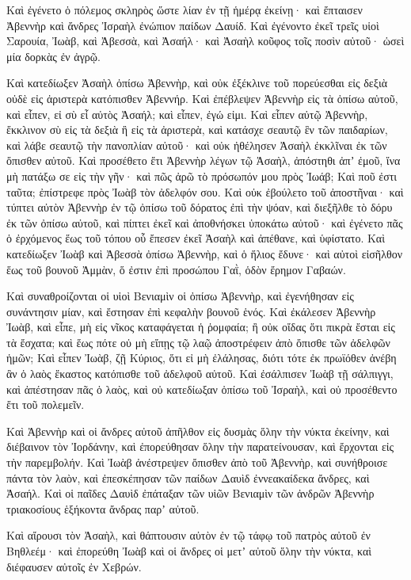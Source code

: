{Καὶ ἐγένετο ὁ πόλεμος σκληρὸς ὥστε λίαν ἐν τῇ ἡμέρᾳ ἐκείνῃ· καὶ ἔπταισεν Ἀβεννὴρ καὶ ἄνδρες Ἰσραὴλ ἐνώπιον παίδων Δαυίδ.
Καὶ ἐγένοντο ἐκεῖ τρεῖς υἱοὶ Σαρουία, Ἰωὰβ, καὶ Ἀβεσσὰ, καὶ Ἀσαήλ· καὶ Ἀσαὴλ κοῦφος τοῖς ποσὶν αὐτοῦ· ὡσεὶ μία δορκὰς ἐν ἀγρῷ.
\par }{\PP {}Καὶ κατεδίωξεν Ἀσαὴλ ὀπίσω Ἀβεννὴρ, καὶ οὐκ ἐξέκλινε τοῦ πορεύεσθαι εἰς δεξιὰ οὐδὲ εἰς ἀριστερὰ κατόπισθεν Ἀβεννήρ.
Καὶ ἐπέβλεψεν Ἀβεννὴρ εἰς τὰ ὀπίσω αὐτοῦ, καὶ εἶπεν, εἰ σὺ εἶ αὐτὸς Ἀσαήλ; καὶ εἶπεν, ἐγώ εἰμι.
Καὶ εἶπεν αὐτῷ Ἀβεννὴρ, ἔκκλινον σὺ εἰς τὰ δεξιὰ ἢ εἰς τὰ ἀριστερὰ, καὶ κατάσχε σεαυτῷ ἓν τῶν παιδαρίων, καὶ λάβε σεαυτῷ τὴν πανοπλίαν αὐτοῦ· καὶ οὐκ ἠθέλησεν Ἀσαὴλ ἐκκλῖναι ἐκ τῶν ὄπισθεν αὐτοῦ.
Καὶ προσέθετο ἔτι Ἀβεννὴρ λέγων τῷ Ἀσαὴλ, ἀπόστηθι ἀπʼ ἐμοῦ, ἵνα μὴ πατάξω σε εἰς τὴν γῆν· καὶ πῶς ἀρῶ τὸ πρόσωπόν μου πρὸς Ἰωάβ;
Καὶ ποῦ ἐστι ταῦτα; ἐπίστρεφε πρὸς Ἰωὰβ τὸν ἀδελφόν σου. Καὶ οὐκ ἐβούλετο τοῦ ἀποστῆναι· καὶ τύπτει αὐτὸν Ἀβεννὴρ ἐν τῷ ὀπίσω τοῦ δόρατος ἐπὶ τὴν ψόαν, καὶ διεξῆλθε τὸ δόρυ ἐκ τῶν ὀπίσω αὐτοῦ, καὶ πίπτει ἐκεῖ καὶ ἀποθνήσκει ὑποκάτω αὐτοῦ· καὶ ἐγένετο πᾶς ὁ ἐρχόμενος ἕως τοῦ τόπου οὗ ἔπεσεν ἐκεῖ Ἀσαὴλ καὶ ἀπέθανε, καὶ ὑφίστατο.
Καὶ κατεδίωξεν Ἰωὰβ καὶ Ἀβεσσὰ ὀπίσω Ἀβεννὴρ, καὶ ὁ ἥλιος ἔδυνε· καὶ αὐτοὶ εἰσῆλθον ἕως τοῦ βουνοῦ Ἀμμὰν, ὅ ἐστιν ἐπὶ προσώπου Γαῒ, ὁδὸν ἔρημον Γαβαών.
\par }{\PP {}Καὶ συναθροίζονται οἱ υἱοὶ Βενιαμὶν οἱ ὀπίσω Ἀβεννὴρ, καὶ ἐγενήθησαν εἰς συνάντησιν μίαν, καὶ ἔστησαν ἐπὶ κεφαλὴν βουνοῦ ἑνός.
Καὶ ἐκάλεσεν Ἀβεννὴρ Ἰωὰβ, καὶ εἶπε, μὴ εἰς νῖκος καταφάγεται ἡ ῥομφαία; ἢ οὐκ οἴδας ὅτι πικρὰ ἔσται εἰς τὰ ἔσχατα; καὶ ἕως πότε οὐ μὴ εἴπῃς τῷ λαῷ ἀποστρέφειν ἀπὸ ὄπισθε τῶν ἀδελφῶν ἡμῶν;
Καὶ εἶπεν Ἰωὰβ, ζῇ Κύριος, ὅτι εἰ μὴ ἐλάλησας, διότι τότε ἐκ πρωϊόθεν ἀνέβη ἂν ὁ λαὸς ἕκαστος κατόπισθε τοῦ ἀδελφοῦ αὐτοῦ.
Καὶ ἐσάλπισεν Ἰωὰβ τῇ σάλπιγγι, καὶ ἀπέστησαν πᾶς ὁ λαὸς, καὶ οὐ κατεδίωξαν ὀπίσω τοῦ Ἰσραὴλ, καὶ οὐ προσέθεντο ἔτι τοῦ πολεμεῖν.
\par }{\PP {}Καὶ Ἀβεννὴρ καὶ οἱ ἄνδρες αὐτοῦ ἀπῆλθον εἰς δυσμὰς ὅλην τὴν νύκτα ἐκείνην, καὶ διέβαινον τὸν Ἰορδάνην, καὶ ἐπορεύθησαν ὅλην τὴν παρατείνουσαν, καὶ ἔρχονται εἰς τὴν παρεμβολήν.
Καὶ Ἰωὰβ ἀνέστρεψεν ὄπισθεν ἀπὸ τοῦ Ἀβεννὴρ, καὶ συνήθροισε πάντα τὸν λαὸν, καὶ ἐπεσκέπησαν τῶν παίδων Δαυὶδ ἐννεακαίδεκα ἄνδρες,
καὶ Ἀσαήλ. Καὶ οἱ παῖδες Δαυὶδ ἐπάταξαν τῶν υἱῶν Βενιαμὶν τῶν ἀνδρῶν Ἀβεννὴρ τριακοσίους ἑξήκοντα ἄνδρας παρʼ αὐτοῦ.
\par }{\PP {}Καὶ αἴρουσι τὸν Ἀσαὴλ, καὶ θάπτουσιν αὐτὸν ἐν τῷ τάφῳ τοῦ πατρὸς αὐτοῦ ἐν Βηθλεέμ· καὶ ἐπορεύθη Ἰωὰβ καὶ οἱ ἄνδρες οἱ μετʼ αὐτοῦ ὅλην τὴν νύκτα, καὶ διέφαυσεν αὐτοῖς ἐν Χεβρών.

}
